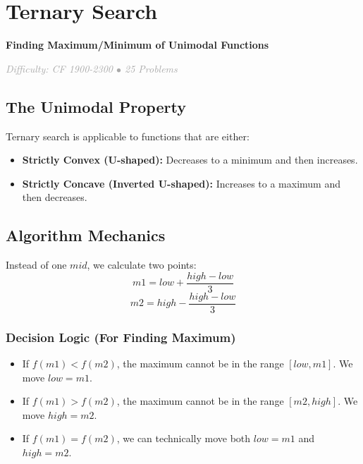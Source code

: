 \documentclass[11pt,a4paper,oneside]{book}
\begin{document}
\chapter{Ternary Search}

\begin{tcolorbox}[
    enhanced,
    colback=white,
    colframe=secondaryblue,
    boxrule=1pt,
    arc=2mm,
    left=10pt,
    right=10pt
]
\textbf{\large\textcolor{primaryblue}{Finding Maximum/Minimum of Unimodal Functions}}
\end{tcolorbox}

\vspace{0.5cm}

\begin{center}
\textit{\textcolor{darkgray}{Difficulty: CF 1900-2300 $\bullet$ 25 Problems}}
\end{center}

\section{The Unimodal Property}
Ternary search is applicable to functions that are either:
\begin{itemize}
    \item \textbf{Strictly Convex (U-shaped):} Decreases to a minimum and then increases.
    \item \textbf{Strictly Concave (Inverted U-shaped):} Increases to a maximum and then decreases.
\end{itemize}

\section{Algorithm Mechanics}
Instead of one $mid$, we calculate two points:
\[ m1 = low + \frac{high - low}{3} \]
\[ m2 = high - \frac{high - low}{3} \]

\subsection{Decision Logic (For Finding Maximum)}
\begin{itemize}
    \item If $f(m1) < f(m2)$, the maximum cannot be in the range $[low, m1]$. We move $low = m1$.
    \item If $f(m1) > f(m2)$, the maximum cannot be in the range $[m2, high]$. We move $high = m2$.
    \item If $f(m1) = f(m2)$, we can technically move both $low = m1$ and $high = m2$.
\end{itemize}
\end{document}
